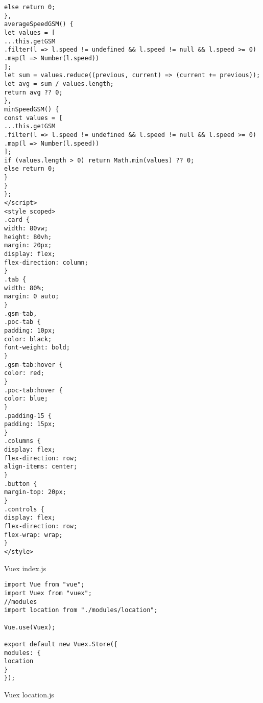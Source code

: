 \begin{verbatim}
else return 0;
},
averageSpeedGSM() {
let values = [
...this.getGSM
.filter(l => l.speed != undefined && l.speed != null && l.speed >= 0)
.map(l => Number(l.speed))
];
let sum = values.reduce((previous, current) => (current += previous));
let avg = sum / values.length;
return avg ?? 0;
},
minSpeedGSM() {
const values = [
...this.getGSM
.filter(l => l.speed != undefined && l.speed != null && l.speed >= 0)
.map(l => Number(l.speed))
];
if (values.length > 0) return Math.min(values) ?? 0;
else return 0;
}
}
};
</script>
<style scoped>
.card {
width: 80vw;
height: 80vh;
margin: 20px;
display: flex;
flex-direction: column;
}
.tab {
width: 80%;
margin: 0 auto;
}
.gsm-tab,
.poc-tab {
padding: 10px;
color: black;
font-weight: bold;
}
.gsm-tab:hover {
color: red;
}
.poc-tab:hover {
color: blue;
}
.padding-15 {
padding: 15px;
}
.columns {
display: flex;
flex-direction: row;
align-items: center;
}
.button {
margin-top: 20px;
}
.controls {
display: flex;
flex-direction: row;
flex-wrap: wrap;
}
</style>
\end{verbatim}
Vuex index.js
\begin{verbatim}
import Vue from "vue";
import Vuex from "vuex";
//modules
import location from "./modules/location";

Vue.use(Vuex);

export default new Vuex.Store({
modules: {
location
}
});
\end{verbatim}
Vuex location.js
